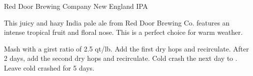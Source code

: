 \begin{recipie}{Red Door Brewing Company New England IPA}

\begin{aboutblock}
This juicy and hazy India pale ale from Red Door Brewing Co. features an intense tropical
fruit and floral nose. This is a perfect choice for warm weather.
\end{aboutblock}


\begin{methodandtiming}
 
\begin{mashsteps}
\end{mashsteps}

\begin{fermentationsteps}
\end{fermentationsteps}

\begin{directions}
Mash with a girst ratio of 2.5 qt/lb. Add the first dry hops and recirculate. After 2 days,
add the second dry hops and recirculate. Cold crash the next day to . Leave cold
crashed for 5 days.
\end{directions}

\end{methodandtiming}

\pagebreak

\begin{ingredientsblock}

\begin{malts}
\end{malts}

\begin{hops}
\end{hops}

\begin{yeasts}
\end{yeasts}

\end{ingredientsblock}

\end{recipie}

